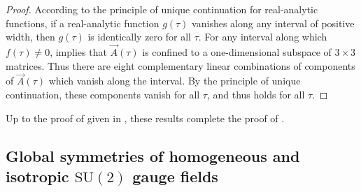 \begin{proof}
According to the principle of unique continuation for real-analytic functions, if a real-analytic function $g(\tau)$ vanishes along any interval of positive width, then $g(\tau)$ is identically zero for all $\tau$. For any interval along which $f(\tau)\neq0$,  implies that $\vec{A}(\tau)$ is confined to a one-dimensional subspace of $3\times3$ matrices. Thus there are eight complementary linear combinations of components of $\vec{A}(\tau)$ which vanish along the interval. By the principle of unique continuation, these components vanish for all $\tau$, and thus  holds for all $\tau$. 
\end{proof}
Up to the proof of  given in , these results complete the proof of .

\subsection{\label{app:global-symmetries}Global symmetries of homogeneous and isotropic \texorpdfstring{$\mathrm{SU}(2)$}{SU(2)} gauge fields}


